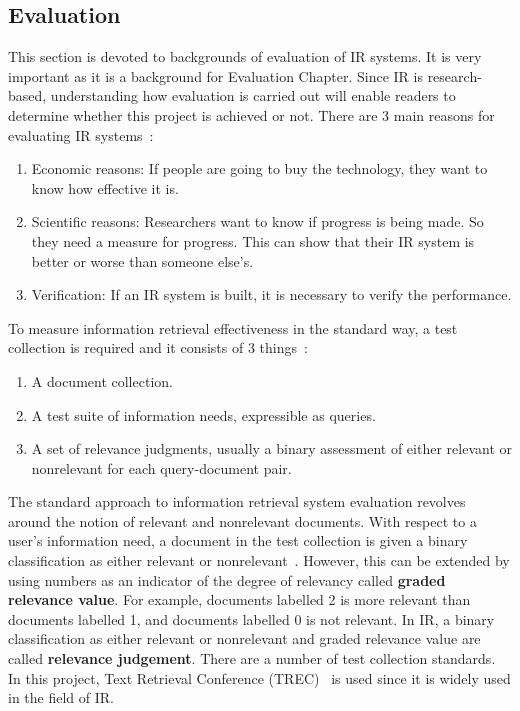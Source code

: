\subsection{Evaluation}\label{sec:background_evaluation}
This section is devoted to backgrounds of evaluation of IR systems. It is very important as it is a background for Evaluation Chapter. 
Since IR is research-based, understanding how evaluation is carried out will enable readers to determine whether 
this project is achieved or not. There are 3 main reasons for evaluating IR systems~\cite[P. 3]{eval}: 
\begin{enumerate}
 \item Economic reasons: If people are going to buy the technology, they want to know how effective it is.
 \item Scientific reasons: Researchers want to know if progress is being made. So they need a measure for progress. 
	This can show that their IR system is better or worse than someone else's.
 \item Verification: If an IR system is built, it is necessary to verify the performance.
\end{enumerate}

To measure information retrieval effectiveness in the standard way, a test collection is required and it consists of 3 things~\cite{evalweb}:
\begin{enumerate}
 \item A document collection.
 \item A test suite of information needs, expressible as queries.
 \item A set of relevance judgments, usually a binary assessment of either relevant or nonrelevant for each query-document pair.
\end{enumerate}

The standard approach to information retrieval system evaluation revolves around the notion of relevant and nonrelevant documents. With respect 
to a user's information need, a document in the test collection is given a binary classification as either relevant or nonrelevant~\cite{evalweb}. However,
this can be extended by using numbers as an indicator of the degree of relevancy called \textbf{graded relevance value}. For example, documents labelled 2 is more relevant than documents
labelled 1, and documents labelled 0 is not relevant. In IR, a binary classification as either relevant or nonrelevant and graded relevance value are
called \textbf{relevance judgement}.
There are a number of test collection standards. In this project, Text Retrieval Conference (TREC)~\cite{trec}
is used since it is widely used in the field of IR.

